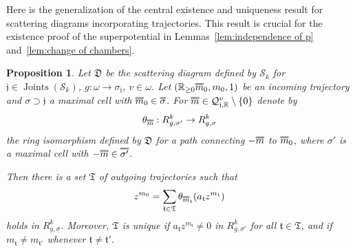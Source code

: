 \documentclass[11pt,letter]{amsart}
\newtheorem{proposition}[theorem]{Proposition}
\theoremstyle{definition}
\theoremstyle{remark}
\numberwithin{equation}{section}
\numberwithin{figure}{section}
\newcommand{\doublebar}[1]{\shortstack{$\overline{\hphantom{#1}}
	$\\[-4pt] $\overline{#1}$}}
\newcommand{\RR} {\mathbb{R}}
\newcommand {\shQ}  {\mathcal{Q}}
\newcommand {\foT}  {\mathfrak{T}}
\newcommand {\foj}  {\mathfrak{j}}
\newcommand {\fot}  {\mathfrak{t}}
\newcommand {\Joints} {\operatorname{Joints}}
\newcommand {\scrS}  {\mathscr{S}}
\newcommand {\D} {\mathfrak D}
\begin{document}
Here is the generalization of the central existence and uniqueness result for
scattering diagrams \cite[Prop.\,3.9]{affinecomplex} incorporating trajectories.
This result is crucial for the existence proof of the superpotential in
Lemmas~\ref{lem:independence of p} and~\ref{lem:change of chambers}.

\begin{proposition}
\label{prop: trajectory scattering}
Let $\D$ be the scattering diagram defined by $\scrS_k$ for
$\foj\in\Joints(\scrS_k)$, $g:\omega\to\sigma_\foj$, $v\in\omega$. Let
$(\RR_{\ge0}\doublebar m_0,m_0,1)$ be an incoming trajectory and $\sigma\supset
\foj$ a maximal cell with $\doublebar m_0\in \doublebar \sigma$. For $\doublebar
m\in \shQ_{\foj,\RR}^v\setminus \{0\}$ denote by
\[
\theta_{\scriptsize\doublebar m}: R^k_{g,\sigma'} \to R^k_{g,\sigma}
\]
the ring isomorphism defined by $\D$ for a path connecting $-\doublebar m$ to
$\doublebar m_0$, where $\sigma'$ is a maximal cell with $-\doublebar
m\in\doublebar{\sigma'}$.

Then there is a set $\foT$ of outgoing trajectories such that
\begin{equation}
\label{eqn:monomial scattering}
z^{m_0}= \sum_{\fot\in\foT} \theta_{\scriptsize\doublebar m_\fot}
(a_\fot z^{m_\fot})
\end{equation}
holds in $R^k_{g,\sigma}$. Moreover, $\foT$ is unique if $a_{\fot}z^{m_\fot}\neq
0$ in $R^k_{g,\sigma'}$ for all $\fot\in\foT$, and if $m_\fot\neq m_{\fot'}$
whenever $\fot\neq\fot'$.
\end{proposition}
\end{document}
